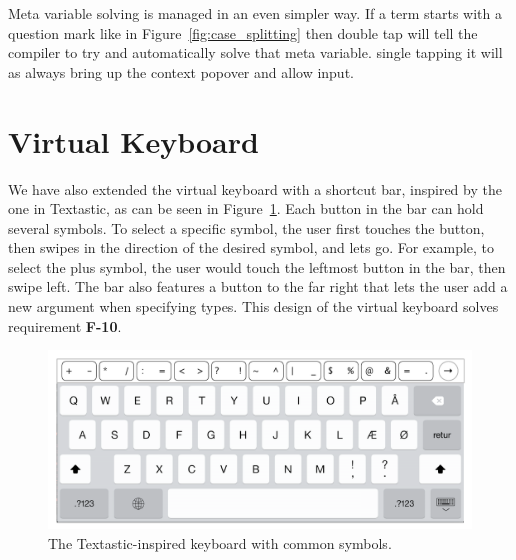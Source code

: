 Meta variable solving is managed in an even simpler way. If a term starts with
a question mark like in Figure~\ref{fig:case_splitting} then double tap will
tell the compiler to try and automatically solve that meta variable. single tapping it will as always
bring up the context popover and allow input.

\section{Virtual Keyboard}
\label{subsec:virtual_keyboard}
We have also extended the virtual keyboard with a shortcut bar, inspired by the one in Textastic, as can be seen in Figure~\ref{fig:design_keyboard}.
Each button in the bar can hold several symbols.
To select a specific symbol, the user first touches the button, then swipes in the direction of the desired symbol, and lets go.
For example, to select the plus symbol, the user would touch the leftmost button in the bar, then swipe left.
The bar also features a button to the far right that lets the user add a new argument when specifying types. 
This design of the virtual keyboard solves requirement \textbf{F-10}. 

\begin{figure}
	\centering
		\includegraphics[width=115mm]{diagrams/design_keyboard.pdf}
	\caption{The Textastic-inspired keyboard with common symbols.}
\label{fig:design_keyboard}
\end{figure}

